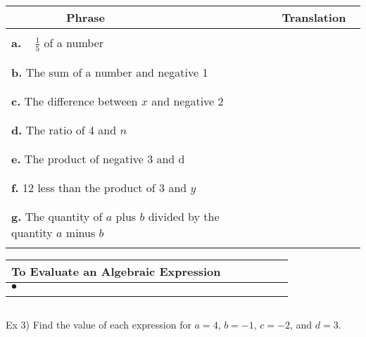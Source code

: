 \documentclass{ximera}
\begin{document}
\begin{tabular}{l|c}
$~~~~~~~~~~~~~~~~~~~~~~$Phrase & $~~~~~~~~~~$Translation$~~~~~~~~~~~~~~~$\\
\hline
$~$\\
\textbf{a.} $~~~~\frac{1}{5}$ of a number& $~$\\
$~$\\
\hline

$~$\\
\textbf{b.} The sum of a number and negative 1 & $~$\\
$~$\\
\hline

$~$\\
\textbf{c.} The difference between $x$ and negative 2 & $~$\\
$~$\\
\hline

$~$\\
\textbf{d.} The ratio of 4 and $n$ & $~$\\
$~$\\
\hline

$~$\\
\textbf{e.} The product of negative 3 and d & $~$\\
$~$\\
\hline
$~$\\
\textbf{f.} 12 less than the product of 3 and $y$ & $~$\\
$~$\\
\hline
$~$\\

\textbf{g.} The quantity of $a$ plus $b$ divided by the quantity $a$ minus $b$ & $~$\\
$~$\\
\end{tabular}

\vspace{.25in}

\begin{center}
\begin{tabular}{|l|}
\hline
\textbf{To Evaluate an Algebraic Expression}  $~~~~~~~~~~~~~~~~~~~~~~~$\\
\hline
$\bullet$\\
$~$\\
\hline
\end{tabular}
\end{center} 

$~$

\noindent Ex 3)  Find the value of each expression for $a=4$, $b=-1$, $c=-2$, and $d=3$.
\end{document}
